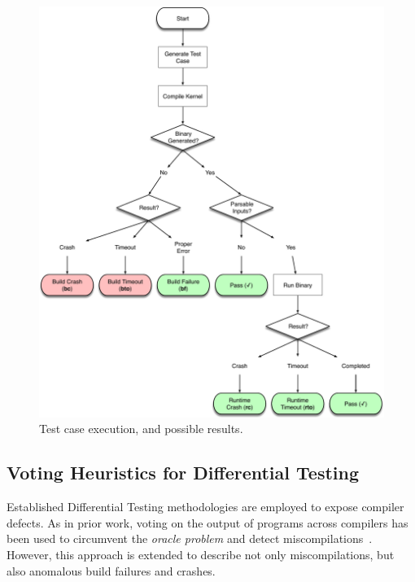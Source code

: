 \begin{figure}
  \centering %
  \includegraphics[width=\columnwidth]{img/testcase-flow-chart}
  \caption[Test case execution, and possible results]{%
    Test case execution, and possible results. %
  }%
  \label{fig:test-process}
\end{figure}


\subsection{Voting Heuristics for Differential Testing}

Established Differential Testing methodologies are employed to expose compiler defects. As in prior work, voting on the output of programs across compilers has been used to circumvent the \emph{oracle problem} and detect miscompilations~\cite{McKeeman1998}. However, this approach is extended to describe not only miscompilations, but also anomalous build failures and crashes.

